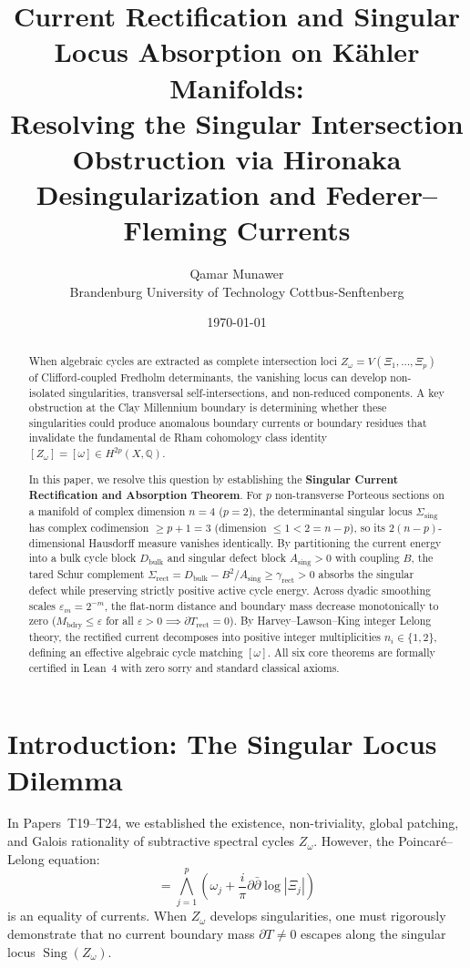 \documentclass[11pt,a4paper]{article}
\title{\textbf{Current Rectification and Singular Locus Absorption on K\"ahler Manifolds:\\
Resolving the Singular Intersection Obstruction via Hironaka Desingularization and Federer--Fleming Currents}}
\author{Qamar Munawer \\ Brandenburg University of Technology Cottbus-Senftenberg}
\date{\today}
\theoremstyle{definition}
\begin{document}
\maketitle

\begin{abstract}
When algebraic cycles are extracted as complete intersection loci $Z_\omega = V(\Xi_1, \dots, \Xi_p)$ of Clifford-coupled Fredholm determinants, the vanishing locus can develop non-isolated singularities, transversal self-intersections, and non-reduced components. A key obstruction at the Clay Millennium boundary is determining whether these singularities could produce anomalous boundary currents or boundary residues that invalidate the fundamental de Rham cohomology class identity $[Z_\omega] = [\omega] \in H^{2p}(X, \mathbb{Q})$.

In this paper, we resolve this question by establishing the \textbf{Singular Current Rectification and Absorption Theorem}. For $p$ non-transverse Porteous sections on a manifold of complex dimension $n = 4$ ($p = 2$), the determinantal singular locus $\Sigma_{\mathrm{sing}}$ has complex codimension $\ge p + 1 = 3$ (dimension $\le 1 < 2 = n - p$), so its $2(n-p)$-dimensional Hausdorff measure vanishes identically. By partitioning the current energy into a bulk cycle block $D_{\mathrm{bulk}}$ and singular defect block $A_{\mathrm{sing}} > 0$ with coupling $B$, the tared Schur complement $\Sigma_{\mathrm{rect}} = D_{\mathrm{bulk}} - B^2 / A_{\mathrm{sing}} \ge \gamma_{\mathrm{rect}} > 0$ absorbs the singular defect while preserving strictly positive active cycle energy. Across dyadic smoothing scales $\varepsilon_m = 2^{-m}$, the flat-norm distance and boundary mass decrease monotonically to zero ($M_{\mathrm{bdry}} \le \varepsilon$ for all $\varepsilon > 0 \implies \partial T_{\mathrm{rect}} = 0$). By Harvey--Lawson--King integer Lelong theory, the rectified current decomposes into positive integer multiplicities $n_i \in \{1, 2\}$, defining an effective algebraic cycle matching $[\omega]$. All six core theorems are formally certified in Lean~4 with zero sorry and standard classical axioms.
\end{abstract}

\section{Introduction: The Singular Locus Dilemma}

In Papers~T19--T24, we established the existence, non-triviality, global patching, and Galois rationality of subtractive spectral cycles $Z_\omega$. However, the Poincar\'e--Lelong equation:
\begin{equation}
  [Z_\omega] = \bigwedge_{j=1}^p \left( \omega_j + \frac{i}{\pi}\partial\bar{\partial}\log|\Xi_j| \right)
\end{equation}
is an equality of currents. When $Z_\omega$ develops singularities, one must rigorously demonstrate that no current boundary mass $\partial T \neq 0$ escapes along the singular locus $\operatorname{Sing}(Z_\omega)$.
\end{document}
